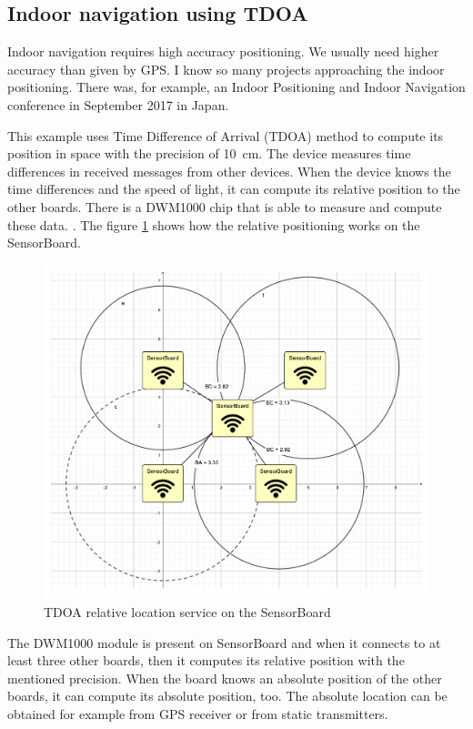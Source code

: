 \subsection{Indoor navigation using \ac{TDOA}}
Indoor navigation requires high accuracy positioning. We usually need higher accuracy than given by GPS. I know so many projects approaching the indoor positioning. There was, for example, an Indoor Positioning and Indoor Navigation conference in September 2017 in Japan.

This example uses Time Difference of Arrival (\ac{TDOA}) method to compute its position in space with the precision of \SI{10}{cm}. The device measures time differences in received messages from other devices. When the device knows the time differences and the speed of light, it can compute its relative position to the other boards. There is a DWM1000 chip that is able to measure and compute these data. \cite{decawave:DWM1000}. The figure \ref{UETDOA} shows how the relative positioning works on the SensorBoard.

\begin{figure}
    \centering
    \label{UETDOA}
    \caption{\ac{TDOA} relative location service on the SensorBoard}
    \includegraphics[trim=5cm 6cm 5cm 5cm, clip, width=15cm]{img/UsageExamplesTDOA.pdf}
\end{figure}

The DWM1000 \cite{decawave:DWM1000} module is present on SensorBoard and when it connects to at least three other boards, then it computes its relative position with the mentioned precision. When the board knows an absolute position of the other boards, it can compute its absolute position, too. The absolute location can be obtained for example from GPS receiver or from static transmitters.

